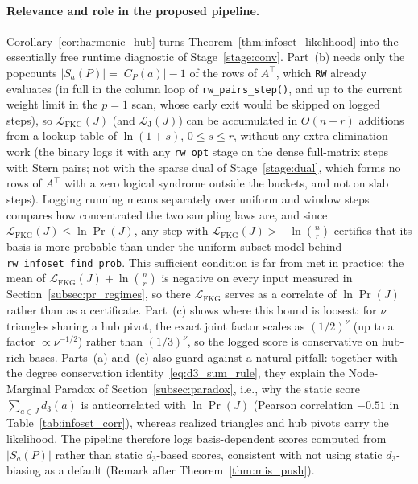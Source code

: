 \documentclass[12pt]{article}
\theoremstyle{definition}
\newcommand{\LH}{\mathcal{L}_{\mathrm{J}}}
\newcommand{\LFKG}{\mathcal{L}_{\mathrm{FKG}}}
\newcommand{\ttt}[1]{\texttt{#1}}
\begin{document}
\paragraph{Relevance and role in the proposed pipeline.}
Corollary~\ref{cor:harmonic_hub} turns Theorem~\ref{thm:infoset_likelihood} into the essentially free runtime
diagnostic of Stage~\ref{stage:conv}. Part~(b) needs only the popcounts $|S_a(P)| = |C_P(a)| - 1$ of the rows of
$A^\top$, which \ttt{RW} already evaluates (in full in the column loop of \ttt{rw\_pairs\_step()}, and up to the
current weight limit in the $p = 1$ scan, whose early exit would be skipped on logged steps), so $\LFKG(J)$ (and
$\LH(J)$) can be accumulated in $O(n - r)$ additions from a lookup table of $\ln(1 + s)$, $0 \le s \le r$, without
any extra elimination work (the binary logs it with any \ttt{rw\_opt} stage on the dense full-matrix steps with
Stern pairs; not with the sparse dual of Stage~\ref{stage:dual}, which forms no rows of $A^\top$ with a zero logical
syndrome outside the buckets, and not on slab steps). Logging running means separately over uniform and window steps
compares how concentrated
the two sampling laws are, and since $\LFKG(J) \le \ln \Pr(J)$,
any step with $\LFKG(J) > -\ln\binom{n}{r}$ certifies that its basis is more probable than under the uniform-subset
model behind \ttt{rw\_infoset\_find\_prob}. This sufficient condition is far from met in practice: the mean of
$\LFKG(J) + \ln\binom{n}{r}$ is negative on every input measured in Section~\ref{subsec:pr_regimes}, so there
$\LFKG$ serves as a correlate of $\ln \Pr(J)$ rather than as a certificate.
Part~(c) shows where this bound is loosest: for $\nu$ triangles sharing a
hub pivot, the exact joint factor scales as $(1/2)^\nu$ (up to a factor $\propto \nu^{-1/2}$) rather than
$(1/3)^\nu$, so the logged score is conservative on hub-rich bases. Parts~(a) and~(c) also guard against a natural
pitfall: together with the degree conservation identity~\eqref{eq:d3_sum_rule}, they explain the Node-Marginal
Paradox of Section~\ref{subsec:paradox}, i.e., why the static score $\sum_{a \in J} d_3(a)$ is anticorrelated with
$\ln \Pr(J)$ (Pearson correlation $-0.51$ in Table~\ref{tab:infoset_corr}), whereas realized triangles and hub pivots
carry the likelihood. The pipeline therefore logs basis-dependent scores computed from $|S_a(P)|$ rather than static
$d_3$-based scores, consistent with not using static $d_3$-biasing as a default (Remark after
Theorem~\ref{thm:mis_push}).

\end{document}
